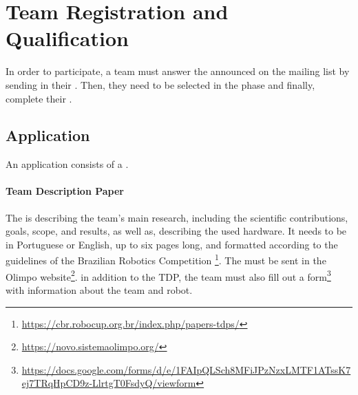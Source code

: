 \section{Team Registration and Qualification}
\label{sec:rules:particpation}

In order to participate, a team must answer the \CFP{} announced on the \AtHome{} mailing list by sending in their \Application{}. Then, they need to be selected in the \Qualification{} phase and finally, complete their \Registration{}.


\subsection{Application}
\label{sec:rules:application}

An application consists of a 
\TDP{}.





\paragraph{Team Description Paper}
\label{sec:rules:application:tdp}
The \TDP{} is describing the team's main research, including the scientific contributions, goals, scope, and results, as well as, describing the used hardware. It needs to be in Portuguese or English, up to six pages long, and formatted according to the guidelines of the Brazilian Robotics Competition \footnote{\url{https://cbr.robocup.org.br/index.php/papers-tdps/}}. 
The \TDP{} must be sent in the Olimpo website\footnote{\url{https://novo.sistemaolimpo.org/}}.
in addition to the TDP, the team must also fill out a form\footnote{\url{https://docs.google.com/forms/d/e/1FAIpQLSch8MFiJPzNzxLMTF1ATssK7ej7TRqHpCD9z-LlrtgT0FsdyQ/viewform}} with information about the team and robot.

